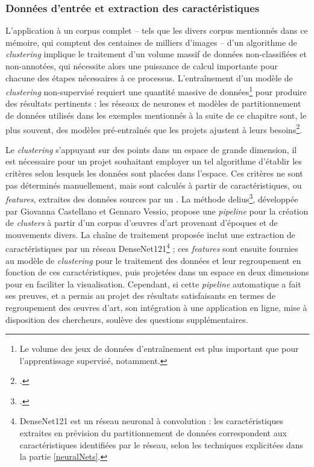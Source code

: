     \subsubsection{Données d'entrée et extraction des caractéristiques}
    L'application à un corpus complet -- tels que les divers corpus mentionnés dans ce mémoire, qui comptent des centaines de milliers d'images -- d'un algorithme de \textit{clustering} implique le traitement d'un volume massif de données non-classifiées et non-annotées, qui nécessite alors une puissance de calcul importante pour chacune des étapes nécessaires à ce processus. L'entraînement d'un modèle de \textit{clustering} non-supervisé requiert une quantité massive de données\footnote{Le volume des jeux de données d'entraînement est plus important que pour l'apprentissage supervisé, notamment.} pour produire des résultats pertinents : les réseaux de neurones et modèles de partitionnement de données utilisés dans les exemples mentionnés à la suite de ce chapitre sont, le plus souvent, des modèles pré-entraînés que les projets ajustent à leurs besoins\footcite{castellanoDeepLearningApproach2022}.
    
    Le \textit{clustering} s'appuyant sur des points dans un espace de grande dimension, il est nécessaire pour un projet souhaitant employer un tel algorithme d'établir les critères selon lesquels les données sont placées dans l'espace. Ces critères ne sont pas déterminés manuellement, mais sont calculés à partir de caractéristiques, ou \textit{features}, extraites des données sources par un \cnn. La méthode \acrfull{delius}\footcite{castellanoDeepLearningApproach2022}, développée par Giovanna Castellano et Gennaro Vessio, propose une \textit{pipeline} pour la création de \textit{clusters} à partir d'un corpus d'œuvres d'art provenant d'époques et de mouvements divers. La chaîne de traitement proposée inclut une extraction de caractéristiques par un réseau DenseNet121\footnote{DenseNet121 est un réseau neuronal à convolution : les caractéristiques extraites en prévision du partitionnement de données correspondent aux caractéristiques identifiées par le réseau, selon les techniques explicitées dans la partie \ref{neuralNets}.} ; ces \textit{features} sont ensuite fournies au modèle de \textit{clustering} pour le traitement des données et leur regroupement en fonction de ces caractéristiques, puis projetées dans un espace en deux dimensions pour en faciliter la visualisation. Cependant, si cette \textit{pipeline} automatique a fait ses preuves, et a permis au projet des résultats satisfaisants en termes de regroupement des œuvres d'art, son intégration à une application en ligne, mise à disposition des chercheurs, soulève des questions supplémentaires. 
    
